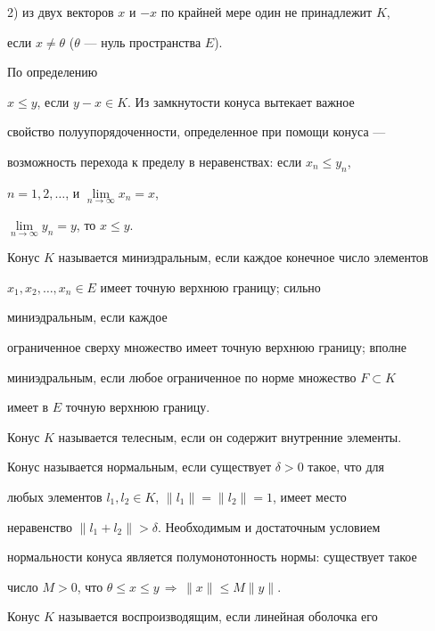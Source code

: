  


2) из двух векторов $x$ и $-x$ по крайней мере один не принадлежит $K$, 


если $x\ne\theta$ ($\theta$ --- нуль пространства $E$). 





По определению 


$x\le y$, если $y-x\in K$. Из замкнутости конуса вытекает важное 


свойство полуупорядоченности, определенное при помощи конуса --- 


возможность перехода к пределу в неравенствах: если $x_n\le y_n$, 


$n=1,2,\dotsc$, и $\lim\limits_{n\to\infty}x_n=x$, 


$\lim\limits_{n\to\infty}y_n=y$, то $x\le y$. 


 


Конус $K$ называется миниэдральным, если каждое конечное число элементов 


$x_1,x_2,\dotsc,x_n{\in} E$ имеет точную верхнюю границу; сильно 


миниэдральным, если каждое 


ограниченное сверху множество имеет точную верхнюю границу; вполне 


миниэдральным, если любое ограниченное по норме множество $F\subset K$ 


имеет в $E$ точную верхнюю границу. 


 


Конус $K$ называется телесным, если он содержит внутренние элементы. 


 


Конус называется нормальным, если существует $\delta>0$ такое, что для 


любых элементов $l_1,l_2\in K$, $\|l_1\|=\|l_2\|=1$, имеет место 


неравенство $\|l_1+l_2\|>\delta$. Необходимым и достаточным условием 


нормальности конуса является полумонотонность нормы: существует такое 


число $M>0$, что $\theta\le x\le y\,\Rightarrow\,\|x\|\le M\|y\|$. 


 


Конус $K$ называется воспроизводящим, если линейная оболочка его 


